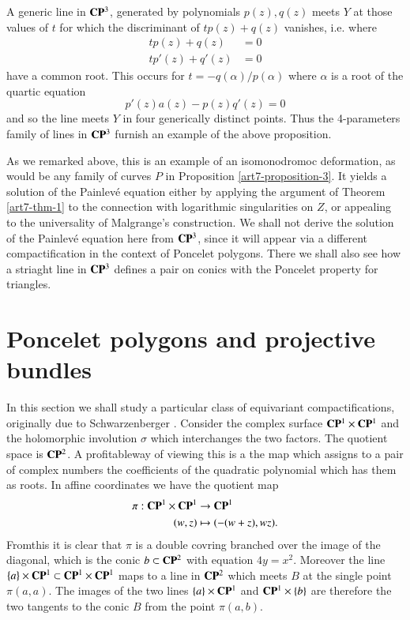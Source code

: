 \begin{example*}
\begin{enumerate}[]
A generic line in $\mathbf{C}\mathbf{P}^{3}$, generated by polynomials $p(z), q(z)$ meets $Y$ at those values of $t$ for which the discriminant of $tp(z) + q(z)$ vanishes, i.e. where
\begin{align*}
tp(z) +q(z) &= 0\\
tp'(z)+q'(z) &= 0
\end{align*}
have a common root. This occurs for $t = -q(\alpha)/p(\alpha)$ where $\alpha$ is a root of the quartic equation
$$
p'(z)a(z)-p(z)q'(z) =0
$$
and so the line meets $Y$ in four generically distinct points. Thus the 4-parameters family of lines in $\mathbf{C}\mathbf{P}^{3}$ furnish an example of the above proposition.
\end{enumerate}
As we remarked above, this is an example of an isomonodromoc deformation, as would be any family of curves $P$ in Proposition \ref{art7-proposition-3}. It yields a solution of the Painlev\'e equation either by applying the argument of Theorem \ref{art7-thm-1} to the connection with logarithmic singularities on $Z$, or appealing to the universality of Malgrange's construction. We shall not derive the solution of the Painlev\'e equation here from $\mathbf{C}\mathbf{P}^{3}$, since it will appear via a different compactification in the context of Poncelet polygons. There we shall also see how a striaght line in $\mathbf{C}\mathbf{P}^{3}$ defines a pair on conics with the Poncelet property for triangles.
\end{example*}

\section{Poncelet polygons and projective bundles}\label{art7-sec-4}

In this section we shall study a particular class of equivariant compactifications, originally due to Schwarzenberger \cite{art7-key16}. Consider the complex surface $\mathbf{C}\mathbf{P}^{1}\times \mathbf{C}\mathbf{P}^{1}$ and the holomorphic involution $\sigma$ which interchanges the two factors. The quotient space is $\mathbf{C}\mathbf{P}^{2}$. A profitableway of viewing this is a the map which assigns to a pair of complex numbers the coefficients of the quadratic polynomial which has them as roots. In affine coordinates we have the quotient map
\begin{align*}
\pi : \mathbf{C}\mathbf{P}^{1} \times \mathbf{C}\mathbf{P}^{1} &\rightarrow \mathbf{C}\mathbf{P}^{1}\\
(w, z) &\mapsto (-(w +z), wz).
\end{align*}
From\pageoriginale this it is clear that $\pi$ is a double covring branched over the image of the diagonal, which is the
conic $b\subset \mathbf{C}\mathbf{P}^{2}$ with equation $4y =x^{2}$. Moreover the line $\{a\} \times \mathbf{C}\mathbf{P}^{1} \subset \mathbf{C}\mathbf{P}^{1} \times \mathbf{C}\mathbf{P}^{1}$ maps to a line in $\mathbf{C}\mathbf{P}^{2}$ which meets $B$ at the single point $\pi(a, a)$. The images of the two lines  $\{a\} \times \mathbf{C}\mathbf{P}^{1}$ and $\mathbf{C}\mathbf{P}^{1} \times \{b\}$ are therefore the two tangents to the conic $B$ from the point $\pi(a, b)$.

